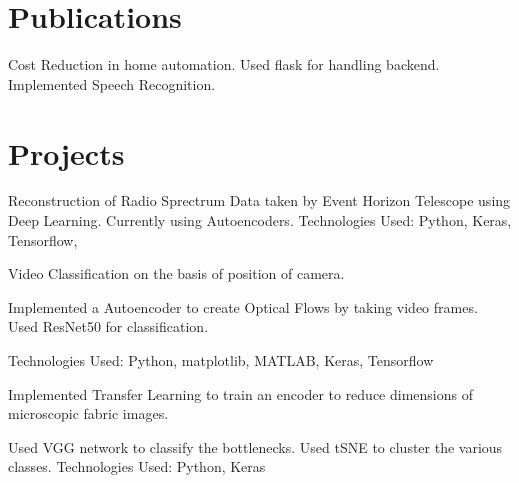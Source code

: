 \documentclass[a4paper]{deedy-resume-openfont}
\begin{document}
\begin{minipage}[t]{0.66\textwidth}
\section{Publications}

Cost Reduction in home automation. Used flask for handling backend. Implemented Speech Recognition.  


\section{Projects}
Reconstruction of Radio Sprectrum Data taken by Event Horizon Telescope using Deep Learning. Currently using Autoencoders. 
Technologies Used: Python, Keras, Tensorflow, 
\sectionsep

\begin{tightemize}
\item Video Classification on the basis of position of camera. \item Implemented a Autoencoder to create Optical Flows by taking video frames. Used ResNet50 for classification.
\item Technologies Used: Python, matplotlib, MATLAB, Keras, Tensorflow
\end{tightemize}
\sectionsep

\begin{tightemize}
\item Implemented Transfer Learning to train an encoder to reduce dimensions of microscopic fabric images. \item Used VGG network to classify the bottlenecks. Used tSNE to cluster the various classes. Technologies Used: Python, Keras
\end{tightemize}
\sectionsep



\end{minipage}
\end{document}
